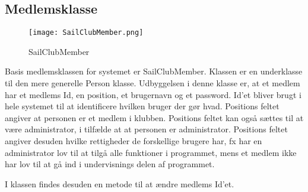 \subsection*{Medlemsklasse}
\begin{wrapfigure}{l}{0.5\textwidth}
    \label{img:login_interface}
    \vspace{-20pt}
    \begin{center}
        \texttt{[image: SailClubMember.png]}
    \end{center}
    \vspace{-20pt}
    \caption{SailClubMember}
    \vspace{-10pt}
\end{wrapfigure}
Basis medlemsklassen for systemet er SailClubMember. 
Klassen er en underklasse til den mere generelle Person klasse. 
Udbyggelsen i denne klasse er, at et medlem har et medlems Id, en position, et brugernavn og et password. 
Id'et bliver brugt i hele systemet til at identificere hvilken bruger der gør hvad. 
Positions feltet angiver at personen er et medlem i klubben. 
Positions feltet kan også sættes til at være administrator, i tilfælde at at personen er administrator. 
Positions feltet angiver desuden hvilke rettigheder de forskellige brugere har, fx har en administrator lov til at tilgå alle funktioner i programmet, mens et medlem ikke har lov til at gå ind i undervisnings delen af programmet. 

I klassen findes desuden en metode til at ændre medlems Id'et.
 